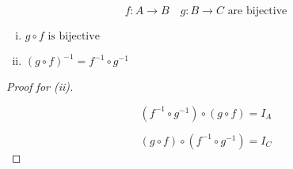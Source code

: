 % 

\begin{frame}{}
  \begin{theorem}
    \[
      f: A \to B \quad g: B \to C \text{ are bijective}
    \]

    \begin{enumerate}[(i)]
      \item $g \circ f \text{ is bijective}$
      \item $(g \circ f)^{-1} = f^{-1} \circ g^{-1}$
    \end{enumerate}
  \end{theorem}

  \begin{proof}[Proof for (ii)]
    \begin{center}
    \end{center}

    \[
      (f^{-1} \circ g^{-1}) \circ (g \circ f) = I_A
    \]

    \[
      (g \circ f) \circ (f^{-1} \circ g^{-1}) = I_C
    \]
  \end{proof}
\end{frame}

